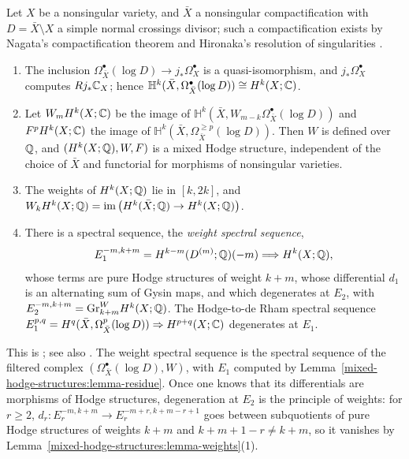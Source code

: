 \begin{theorem}[Deligne]\label{mixed-hodge-structures:theorem-smooth}
Let $X$ be a nonsingular variety, and $\bar X$ a nonsingular compactification with $D = \bar X \setminus X$ a simple normal crossings divisor; such a compactification exists by Nagata's compactification
theorem and Hironaka's resolution of singularities \cite{hironaka-1964}.
\begin{enumerate}
\item The inclusion $\Omega^\bullet_{\bar X}(\log D) \to j_*\Omega^\bullet_X$ is a quasi-isomorphism, and $j_*\Omega^\bullet_X$ computes $Rj_*\mathbb{C}_X$; hence
$\mathbb{H}^k(\bar X, \Omega^\bullet_{\bar X}(\log D)) \cong H^k(X; \mathbb{C})$.
\item Let $W_mH^k(X; \mathbb{C})$ be the image of $\mathbb{H}^k(\bar X, W_{m-k}\Omega^\bullet_{\bar X}(\log D))$ and $F^pH^k(X; \mathbb{C})$ the image of $\mathbb{H}^k(\bar X, \Omega^{\geq p}_{\bar X}(\log D))$. Then $W$ is
defined over $\mathbb{Q}$, and $(H^k(X; \mathbb{Q}), W, F)$ is a mixed Hodge structure, independent of the choice of $\bar X$ and functorial for morphisms of nonsingular varieties.
\item The weights of $H^k(X; \mathbb{Q})$ lie in $[k, 2k]$, and $W_kH^k(X; \mathbb{Q}) = \operatorname{im}\big(H^k(\bar X; \mathbb{Q}) \to H^k(X; \mathbb{Q})\big)$.
\item There is a spectral sequence, the \emph{weight spectral sequence},
\[
E_1^{-m,k+m} = H^{k-m}(D^{(m)}; \mathbb{Q})(-m) \Longrightarrow H^k(X; \mathbb{Q}),
\]
whose terms are pure Hodge structures of weight $k + m$, whose differential $d_1$ is an alternating sum of Gysin maps, and which degenerates at $E_2$, with $E_2^{-m,k+m} = \mathrm{Gr}^W_{k+m}H^k(X; \mathbb{Q})$.
The Hodge-to-de Rham spectral sequence $E_1^{p,q} = H^q(\bar X, \Omega^p_{\bar X}(\log D)) \Rightarrow H^{p+q}(X; \mathbb{C})$ degenerates at $E_1$.
\end{enumerate}
\end{theorem}

This is \cite[Section 3]{deligne-hodge-2}; see also \cite[Chapter 4]{peters-steenbrink}. The weight spectral sequence is the spectral sequence of the filtered complex $(\Omega^\bullet_{\bar X}(\log D), W)$,
with $E_1$ computed by Lemma~\ref{mixed-hodge-structures:lemma-residue}. Once one knows that its differentials are morphisms of Hodge structures, degeneration at $E_2$ is the principle of weights: for
$r \geq 2$, $d_r \colon E_r^{-m,k+m} \to E_r^{-m+r,k+m-r+1}$ goes between subquotients of pure Hodge structures of weights $k + m$ and $k + m + 1 - r \neq k + m$, so it vanishes by
Lemma~\ref{mixed-hodge-structures:lemma-weights}(1).

